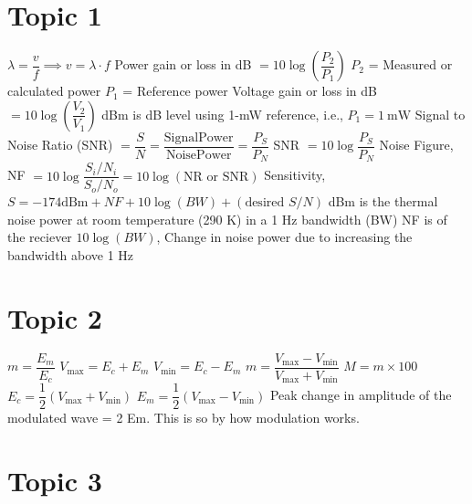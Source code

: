 \documentclass[openany]{book}
\begin{document}
\chapter*{Topic 1}

\begin{outline}
	\1 $\lambda = \dfrac{v}{f} \implies v = \lambda \cdot f$
	\1 Power gain or loss in dB $= 10 \log \left( \dfrac{P_2}{P_1} \right)$
	\2 $P_2$ = Measured or calculated power
	\2 $P_1$ = Reference power
	\1 Voltage gain or loss in dB $= 10 \log \left( \dfrac{V_2}{V_1} \right)$
	\1 dBm is dB level using 1-mW reference, i.e., $P_1 = 1\ \text{mW}$
	\1 Signal to Noise Ratio (SNR) $= \dfrac{S}{N} = \mathrm{\dfrac{Signal Power}{Noise Power}} = \dfrac{P_S}{P_N}$
	\1 SNR $= 10 \log \dfrac{P_S}{P_N}$
	\1 Noise Figure, NF $= 10 \log \dfrac{S_i /N_i}{S_o /N_o} = 10 \log (\text{NR or SNR})$
	\1 Sensitivity, $S = -174 \text{dBm} + NF + 10 \log (BW) + (\text{desired } S/N)$
	 dBm is the thermal noise power at room temperature (290 K) in a 1 Hz bandwidth (BW)
	\2 NF is of the reciever
	\2 $10 \log (BW)$, Change in noise power due to increasing  the bandwidth above 1 Hz
\end{outline}

\chapter*{Topic 2}

\begin{outline}
	\1 $m = \dfrac{E_m}{E_c}$
	\1 $V_{\max} = E_c + E_m$
	\1 $V_{\min} = E_c - E_m$
	\1 $m = \dfrac{V_{\max} - V_{\min}}{V_{\max} + V_{\min}}$
	\1 $M = m \times 100$
	\1 $E_c = \dfrac{1}{2} ( V_{ \max } + V_{ \min } )$
	\1 $E_m = \dfrac{1}{2} ( V_{ \max } - V_{ \min } )$
	\1 Peak change in amplitude of the modulated wave = 2 Em. This is so by how modulation works.
\end{outline}

\chapter*{Topic 3}
\end{document}
